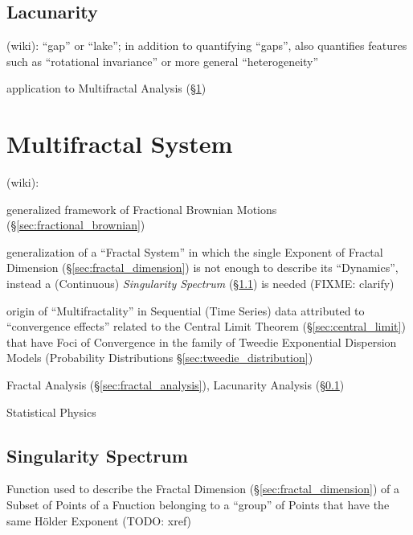 \subsection{Lacunarity}\label{sec:lacunarity}

(wiki): ``gap'' or ``lake''; in addition to quantifying ``gaps'', also
quantifies features such as ``rotational invariance'' or more general
``heterogeneity''

application to Multifractal Analysis (\S\ref{sec:multifractal_system})



\section{Multifractal System}\label{sec:multifractal_system}

(wiki):

generalized framework of Fractional Brownian Motions
(\S\ref{sec:fractional_brownian})

generalization of a ``Fractal System'' in which the single Exponent of Fractal
Dimension (\S\ref{sec:fractal_dimension}) is not enough to describe its
``Dynamics'',  instead a (Continuous) \emph{Singularity Spectrum}
(\S\ref{sec:singularity_spectrum}) is needed (FIXME: clarify)

origin of ``Multifractality'' in Sequential (Time Series) data attributed to
``convergence effects'' related to the Central Limit Theorem
(\S\ref{sec:central_limit}) that have Foci of Convergence in the family of
Tweedie Exponential Dispersion Models (Probability Distributions
\S\ref{sec:tweedie_distribution})

Fractal Analysis (\S\ref{sec:fractal_analysis}), Lacunarity Analysis
(\S\ref{sec:lacunarity})

Statistical Physics



\subsection{Singularity Spectrum}\label{sec:singularity_spectrum}

Function used to describe the Fractal Dimension (\S\ref{sec:fractal_dimension})
of a Subset of Points of a Fnuction belonging to a ``group'' of Points that have
the same H\"older Exponent (TODO: xref)
